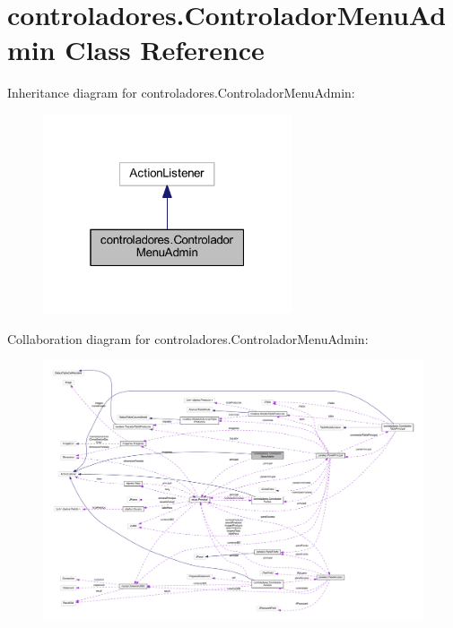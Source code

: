 \hypertarget{classcontroladores_1_1_controlador_menu_admin}{}\section{controladores.\+Controlador\+Menu\+Admin Class Reference}
\label{classcontroladores_1_1_controlador_menu_admin}


Inheritance diagram for controladores.\+Controlador\+Menu\+Admin\+:
\nopagebreak
\begin{figure}[H]
\begin{center}
\leavevmode
\includegraphics[width=208pt]{classcontroladores_1_1_controlador_menu_admin__inherit__graph}
\end{center}
\end{figure}


Collaboration diagram for controladores.\+Controlador\+Menu\+Admin\+:
\nopagebreak
\begin{figure}[H]
\begin{center}
\leavevmode
\includegraphics[width=350pt]{classcontroladores_1_1_controlador_menu_admin__coll__graph}
\end{center}
\end{figure}
